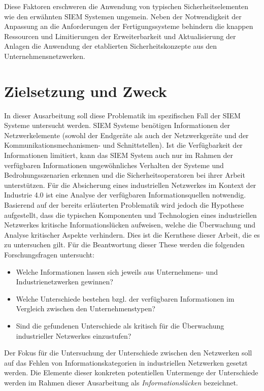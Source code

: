 Diese Faktoren erschweren die Anwendung von typischen Sicherheitselementen wie den erwähnten SIEM Systemen ungemein. Neben der Notwendigkeit der Anpassung an die Anforderungen der Fertigungssysteme behindern die knappen Ressourcen und Limitierungen der Erweiterbarkeit und Aktualisierung der Anlagen die Anwendung der etablierten Sicherheitskonzepte aus den Unternehmensnetzwerken.

\section{Zielsetzung und Zweck}
In dieser Ausarbeitung soll diese Problematik im spezifischen Fall der SIEM Systeme untersucht werden. SIEM Systeme benötigen Informationen der Netzwerkelemente (sowohl der Endgeräte als auch der Netzwerkgeräte und der Kommunikationsmechanismen- und Schnittstellen). Ist die Verfügbarkeit der Informationen limitiert, kann das SIEM System auch nur im Rahmen der verfügbaren Informationen ungewöhnliches Verhalten der Systeme und Bedrohungsszenarien erkennen und die Sicherheitsoperatoren bei ihrer Arbeit unterstützen. Für die Absicherung eines industriellen Netzwerkes im Kontext der Industrie 4.0 ist eine Analyse der verfügbaren Informationsquellen notwendig. Basierend auf der bereits erläuterten Problematik wird jedoch die Hypothese aufgestellt, dass die typischen Komponenten und Technologien eines industriellen Netzwerkes kritische Informationslücken aufweisen, welche die Überwachung und Analyse kritischer Aspekte verhindern. Dies ist die Kernthese dieser Arbeit, die es zu untersuchen gilt. Für die Beantwortung dieser These werden die folgenden Forschungsfragen untersucht:
\begin{itemize}
\item Welche Informationen lassen sich jeweils aus Unternehmens- und Industrienetzwerken gewinnen?
\item Welche Unterschiede bestehen bzgl. der verfügbaren Informationen im Vergleich zwischen den Unternehmenstypen?
\item Sind die gefundenen Unterschiede als kritisch für die Überwachung industrieller Netzwerkes einzustufen?
\end{itemize}

Der Fokus für die Untersuchung der Unterschiede zwischen den Netzwerken soll auf das Fehlen von Informationskategorien in industriellen Netzwerken gesetzt werden. Die Elemente dieser konkreten potentiellen Untermenge der Unterschiede werden im Rahmen dieser Ausarbeitung als \textit{Informationslücken} bezeichnet.

